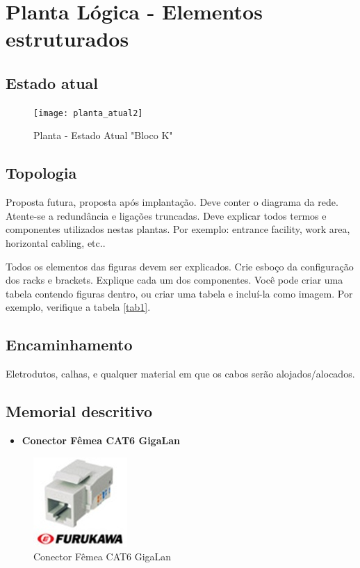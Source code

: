 \documentclass[	DIV=calc,%
							paper=a4,%
							fontsize=12pt,%
							onecolumn]{scrartcl}	 					%
\begin{document}
\section{Planta Lógica - Elementos estruturados}

\subsection{Estado atual}
\begin{figure}
	\centering
	\caption{Planta - Estado Atual "Bloco K"}
	\texttt{[image: planta\_atual2]}
\end{figure}

\subsection{Topologia}
Proposta futura, proposta após implantação.
Deve conter o diagrama da rede. Atente-se a redundância  e ligações truncadas.
Deve explicar todos termos e componentes utilizados nestas plantas. Por exemplo: entrance facility, work area, horizontal cabling, etc..

Todos os elementos das figuras devem ser explicados. 
Crie esboço da configuração dos racks e brackets. Explique cada um dos componentes. Você pode criar uma tabela contendo figuras dentro, ou criar uma tabela e incluí-la como imagem. Por exemplo, verifique a tabela \ref{tab1}.



\subsection{Encaminhamento}
Eletrodutos, calhas, e qualquer material em que os cabos serão alojados/alocados.

\subsection{Memorial descritivo}

\begin{itemize}
	\item \textbf{Conector Fêmea CAT6 GigaLan} 
\end{itemize}

\begin{figure}
	\centering
	\caption{Conector Fêmea CAT6 GigaLan}
	\includegraphics{keystone1}
\end{figure}
\end{document}
